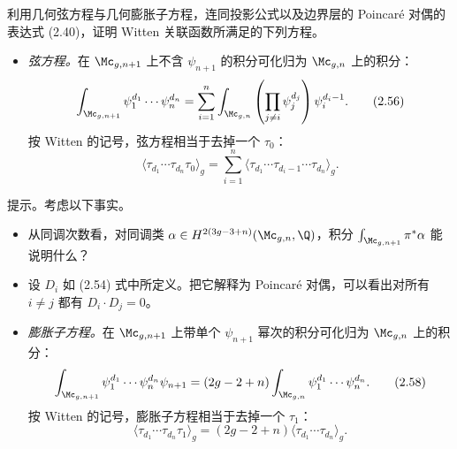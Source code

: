 \begin{exercise}[2.5]
利用几何弦方程与几何膨胀子方程，连同投影公式以及边界层的 Poincaré 对偶的表达式 (2.40)，证明 Witten 关联函数所满足的下列方程。


\begin{itemize}
  \item \emph{弦方程。}在 $\Mc_{g,n+1}$ 上不含 $\psi_{n+1}$ 的积分可化归为 $\Mc_{g,n}$ 上的积分：
  \begin{equation}
    \int_{\Mc_{g,n+1}}\psi_1^{d_1}\cdots\psi_n^{d_n}=\sum_{i=1}^{n}\int_{\Mc_{g,n}}\left(\prod_{j\ne i}\psi_j^{d_j}\right)\psi_i^{d_i-1}.
    \tag{2.56}
  \end{equation}
  按 Witten 的记号，弦方程相当于去掉一个 $\tau_0$：
  \begin{equation}
    \langle\tau_{d_1}\cdots\tau_{d_n}\tau_0\rangle_g=\sum_{i=1}^{n}\langle\tau_{d_1}\cdots\tau_{d_i-1}\cdots\tau_{d_n}\rangle_g .
    \tag{2.57}
  \end{equation}
\end{itemize}

\noindent 提示。考虑以下事实。
\begin{itemize}[label=--]
  \item 从同调次数看，对同调类 $\alpha\in H^{2(3g-3+n)}(\Mc_{g,n},\Q)$，积分 $\int_{\Mc_{g,n+1}}\pi^*\alpha$ 能说明什么？
  \item 设 $D_i$ 如 (2.54) 式中所定义。把它解释为 Poincaré 对偶，可以看出对所有 $i\ne j$ 都有 $D_i\cdot D_j=0$。
\end{itemize}

\begin{itemize}
  \item \emph{膨胀子方程。}在 $\Mc_{g,n+1}$ 上带单个 $\psi_{n+1}$ 幂次的积分可化归为 $\Mc_{g,n}$ 上的积分：
  \begin{equation}
    \int_{\Mc_{g,n+1}}\psi_1^{d_1}\cdots\psi_n^{d_n}\psi_{n+1}=(2g-2+n)\int_{\Mc_{g,n}}\psi_1^{d_1}\cdots\psi_n^{d_n}.
    \tag{2.58}
  \end{equation}
  按 Witten 的记号，膨胀子方程相当于去掉一个 $\tau_1$：
  \begin{equation}
    \langle\tau_{d_1}\cdots\tau_{d_n}\tau_1\rangle_g=(2g-2+n)\langle\tau_{d_1}\cdots\tau_{d_n}\rangle_g .
    \tag{2.59}
  \end{equation}
\end{itemize}
\end{exercise}


